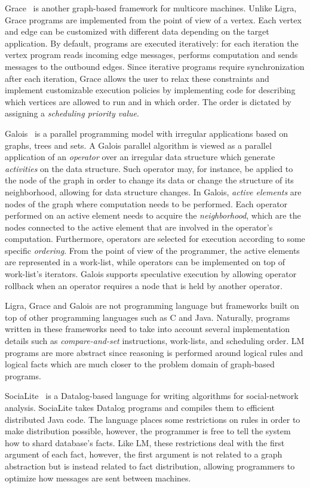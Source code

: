 Grace~\cite{wang:asynchronous} is another graph-based framework for multicore
machines. Unlike Ligra, Grace programs are implemented from the point of view of
a vertex. Each vertex and edge can be customized with different data depending
on the target application. By default, programs are executed iteratively: for
each iteration the vertex program reads incoming edge messages, performs
computation and sends messages to the outbound edges. Since iterative programs
require synchronization after each iteration, Grace allows the user to relax
these constraints and implement customizable execution policies by implementing
code for describing which vertices are allowed to run and in which order. The
order is dictated by assigning a \emph{scheduling priority value}.

Galois~\cite{Pingali:2011:TPA:1993316.1993501} is a parallel programming model
with irregular applications based on graphs, trees and sets. A Galois parallel
algorithm is viewed as a parallel application of an \emph{operator} over an
irregular data structure which generate \emph{activities} on the data structure.
Such operator may, for instance, be applied to the node of the graph in order to
change its data or change the structure of its neighborhood, allowing for data
structure changes. In Galois, \emph{active elements} are nodes of the graph
where computation needs to be performed. Each operator performed on an active
element needs to acquire the \emph{neighborhood}, which are the nodes connected
to the active element that are involved in the operator's computation.
Furthermore, operators are selected for execution according to some specific
\emph{ordering}. From the point of view of the programmer, the active elements
are represented in a work-list, while operators can be implemented on top of
work-list's iterators. Galois supports speculative execution by allowing
operator rollback when an operator requires a node that is held by another
operator.

Ligra, Grace and Galois are not programming language but frameworks built on top
of other programming languages such as C and Java. Naturally, programs written
in these frameworks need to take into account several implementation details
such as \emph{compare-and-set} instructions, work-lists, and scheduling order.
LM programs are more abstract since reasoning is performed around logical rules
and logical facts which are much closer to the problem domain of graph-based
programs.

SociaLite~\cite{Seo:2013:DSD:2556549.2556572} is a Datalog-based language for
writing algorithms for social-network analysis. SociaLite takes Datalog programs
and compiles them to efficient distributed Java code. The language places some
restrictions on rules in order to make distribution possible, however, the
programmer is free to tell the system how to shard database's facts. Like LM,
these restrictions deal with the first argument of each fact, however, the first
argument is not related to a graph abstraction but is instead related to fact
distribution, allowing programmers to optimize how messages are sent between
machines.

